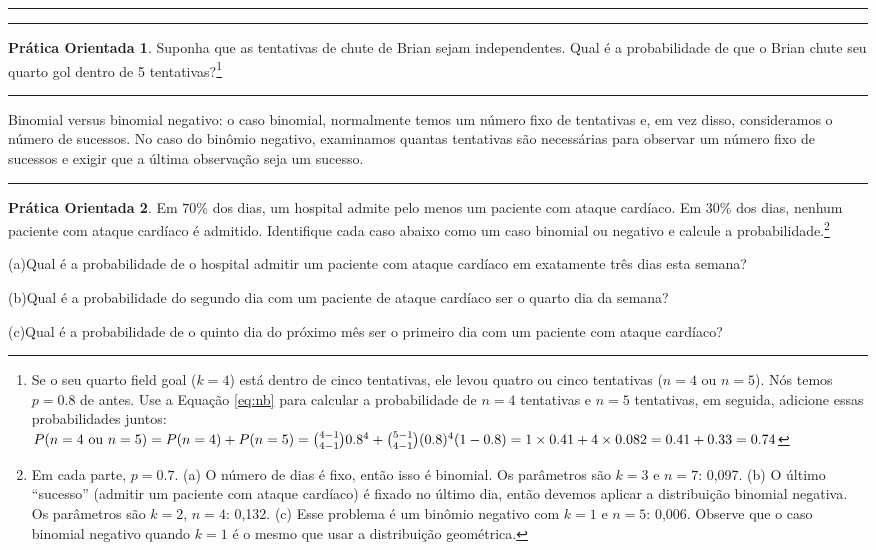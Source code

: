 \documentclass[
]{book}
\theoremstyle{definition}
\theoremstyle{definition}
\theoremstyle{definition}
\newtheorem{exercise}{Prática Orientada}[chapter]
\theoremstyle{definition}
\theoremstyle{remark}
\begin{document}
\begin{center}\rule{0.5\linewidth}{0.5pt}\end{center}

\begin{center}\rule{0.5\linewidth}{0.5pt}\end{center}

\begin{exercise}
\protect\hypertarget{exr:unnamed-chunk-146}{}{\label{exr:unnamed-chunk-146} }Suponha que as tentativas de chute de Brian sejam independentes. Qual é a probabilidade de que o Brian chute seu quarto gol dentro de 5 tentativas?\footnote{Se o seu quarto field goal (\(k=4\)) está dentro de cinco tentativas, ele levou quatro ou cinco tentativas (\(n=4\) ou \(n=5\)). Nós temos \(p=0.8\) de antes. Use a Equação \eqref{eq:nb} para calcular a probabilidade de \(n=4\) tentativas e \(n=5\) tentativas, em seguida, adicione essas probabilidades juntos: \(P(n=4\text{ ou }n=5) = P(n=4) + P(n=5) \\ = {4-1 \choose 4-1} 0.8^4 + {5-1 \choose 4-1} (0.8)^4(1-0.8) = 1\times 0.41 + 4\times 0.082 = 0.41 + 0.33 = 0.74\)}
\end{exercise}

\begin{center}\rule{0.5\linewidth}{0.5pt}\end{center}

Binomial versus binomial negativo: o caso binomial, normalmente temos um número fixo de tentativas e, em vez disso, consideramos o número de sucessos. No caso do binômio negativo, examinamos quantas tentativas são necessárias para observar um número fixo de sucessos e exigir que a última observação seja um sucesso.

\begin{center}\rule{0.5\linewidth}{0.5pt}\end{center}

\begin{exercise}
\protect\hypertarget{exr:unnamed-chunk-147}{}{\label{exr:unnamed-chunk-147} }Em \(70\%\) dos dias, um hospital admite pelo menos um paciente com ataque cardíaco. Em \(30\%\) dos dias, nenhum paciente com ataque cardíaco é admitido. Identifique cada caso abaixo como um caso binomial ou negativo e calcule a probabilidade.\footnote{Em cada parte, \(p=0.7\). (a) O número de dias é fixo, então isso é binomial. Os parâmetros são \(k=3\) e \(n=7\): 0,097. (b) O último ``sucesso'' (admitir um paciente com ataque cardíaco) é fixado no último dia, então devemos aplicar a distribuição binomial negativa. Os parâmetros são \(k=2\), \(n=4\): 0,132. (c) Esse problema é um binômio negativo com \(k=1\) e \(n=5\): 0,006. Observe que o caso binomial negativo quando \(k=1\) é o mesmo que usar a distribuição geométrica.}

(a)Qual é a probabilidade de o hospital admitir um paciente com ataque cardíaco em exatamente três dias esta semana?

(b)Qual é a probabilidade do segundo dia com um paciente de ataque cardíaco ser o quarto dia da semana?

(c)Qual é a probabilidade de o quinto dia do próximo mês ser o primeiro dia com um paciente com ataque cardíaco?
\end{exercise}
\end{document}
